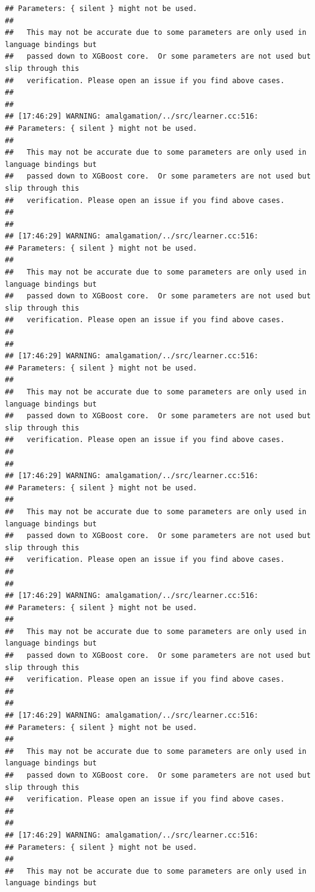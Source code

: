 \documentclass[AMS,STIX2COL]{WileyNJD-v2}\usepackage[]{graphicx}\usepackage[]{color}
\makeatletter
\newenvironment{kframe}{%
 \def\at@end@of@kframe{}%
 \ifinner\ifhmode%
  \def\at@end@of@kframe{\end{minipage}}%
  \begin{minipage}{\columnwidth}%
 \fi\fi%
 \def\FrameCommand##1{\hskip\@totalleftmargin \hskip-\fboxsep
 \colorbox{shadecolor}{##1}\hskip-\fboxsep
     \hskip-\linewidth \hskip-\@totalleftmargin \hskip\columnwidth}%
 \MakeFramed {\advance\hsize-\width
   \@totalleftmargin\z@ \linewidth\hsize
   \@setminipage}}%
 {\par\unskip\endMakeFramed%
 \at@end@of@kframe}
\newenvironment{knitrout}{}{} %
\makeatother
\begin{document}
\begin{knitrout}
\begin{kframe}
\begin{verbatim}
## Parameters: { silent } might not be used.
## 
##   This may not be accurate due to some parameters are only used in language bindings but
##   passed down to XGBoost core.  Or some parameters are not used but slip through this
##   verification. Please open an issue if you find above cases.
## 
## 
## [17:46:29] WARNING: amalgamation/../src/learner.cc:516: 
## Parameters: { silent } might not be used.
## 
##   This may not be accurate due to some parameters are only used in language bindings but
##   passed down to XGBoost core.  Or some parameters are not used but slip through this
##   verification. Please open an issue if you find above cases.
## 
## 
## [17:46:29] WARNING: amalgamation/../src/learner.cc:516: 
## Parameters: { silent } might not be used.
## 
##   This may not be accurate due to some parameters are only used in language bindings but
##   passed down to XGBoost core.  Or some parameters are not used but slip through this
##   verification. Please open an issue if you find above cases.
## 
## 
## [17:46:29] WARNING: amalgamation/../src/learner.cc:516: 
## Parameters: { silent } might not be used.
## 
##   This may not be accurate due to some parameters are only used in language bindings but
##   passed down to XGBoost core.  Or some parameters are not used but slip through this
##   verification. Please open an issue if you find above cases.
## 
## 
## [17:46:29] WARNING: amalgamation/../src/learner.cc:516: 
## Parameters: { silent } might not be used.
## 
##   This may not be accurate due to some parameters are only used in language bindings but
##   passed down to XGBoost core.  Or some parameters are not used but slip through this
##   verification. Please open an issue if you find above cases.
## 
## 
## [17:46:29] WARNING: amalgamation/../src/learner.cc:516: 
## Parameters: { silent } might not be used.
## 
##   This may not be accurate due to some parameters are only used in language bindings but
##   passed down to XGBoost core.  Or some parameters are not used but slip through this
##   verification. Please open an issue if you find above cases.
## 
## 
## [17:46:29] WARNING: amalgamation/../src/learner.cc:516: 
## Parameters: { silent } might not be used.
## 
##   This may not be accurate due to some parameters are only used in language bindings but
##   passed down to XGBoost core.  Or some parameters are not used but slip through this
##   verification. Please open an issue if you find above cases.
## 
## 
## [17:46:29] WARNING: amalgamation/../src/learner.cc:516: 
## Parameters: { silent } might not be used.
## 
##   This may not be accurate due to some parameters are only used in language bindings but

\end{verbatim}
\end{kframe}
\end{knitrout}
\end{document}
